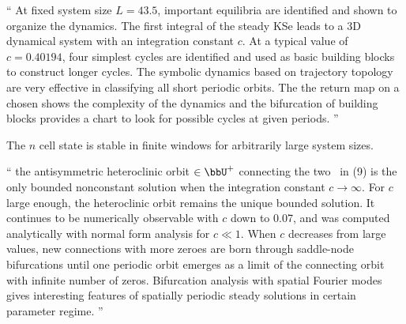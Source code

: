 `` At fixed system size $L =43.5$, important equilibria
      are identified and shown to organize the dynamics. The first
      integral of the steady KSe leads to a 3D dynamical system with an
      integration constant $c$. At a typical value of $c = 0.40194$, four
      simplest cycles are identified and used as basic building blocks to
      construct longer cycles. The symbolic dynamics based on trajectory
      topology are very effective in classifying all short periodic
      orbits. The the return map on a chosen {\PoincSec} shows the
      complexity of the dynamics and the bifurcation of building blocks
      provides a chart to look for possible cycles at given periods. ''

The $n$ cell state is stable in finite windows for
arbitrarily large system sizes.

``
the antisymmetric heteroclinic orbit $\in \bbU^+$ connecting the two \eqva\ in
(9) is the only bounded nonconstant solution when the integration
constant $c\to\infty$. For $c$ large enough, the heteroclinic
orbit remains the unique bounded solution. It continues to be
numerically observable with $c$ down to 0.07, and was
computed analytically with normal form analysis for $c\ll
1$. When $c$ decreases from large values, new connections
with more zeroes are born through saddle-node bifurcations until one
periodic orbit emerges as a limit of the connecting orbit with infinite
number of zeros. Bifurcation analysis with spatial Fourier modes gives
interesting features of spatially periodic steady solutions in certain
parameter regime.
''

\printbibliography[heading=subbibintoc,title={References}]
